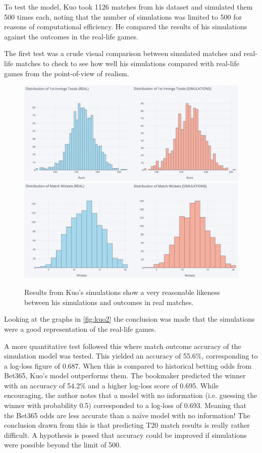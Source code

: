 To test the model, Kuo took 1126 matches from his dataset and simulated them 500 times each, noting that the number of simulations was limited to 500 for reasons of computational efficiency. He compared the results of his simulations against the outcomes in the real-life games.

The first test was a crude visual comparison between simulated matches and real-life matches to check to see how well his simulations compared with real-life games from the point-of-view of realism.

\begin{figure}[hb]
    \centering
    \includegraphics[width=0.7\columnwidth]{images/kuo2.png}
    \includegraphics[width=0.7\columnwidth]{images/kuo3.png}
    \caption{Results from Kuo's simulations show a very reasonable likeness between his simulations and outcomes in real matches.}
    \label{fig:kuo2}
\end{figure}

Looking at the graphs in \autoref{fig:kuo2} the conclusion was made that the simulations were a good representation of the real-life games.

A more quantitative test followed this where match outcome accuracy of the simulation model was tested. This yielded an accuracy of 55.6\%, corresponding to a log-loss figure of 0.687. When this is compared to historical betting odds from Bet365, Kuo’s model outperforms them. The bookmaker predicted the winner with an accuracy of 54.2\% and a higher log-loss score of 0.695. While encouraging, the author notes that a model with no information (i.e. guessing the winner with probability 0.5) corresponded to a log-loss of 0.693. Meaning that the Bet365 odds are less accurate than a naïve model with no information! The conclusion drawn from this is that predicting T20 match results is really rather difficult. A hypothesis is posed that accuracy could be improved if simulations were possible beyond the limit of 500.

